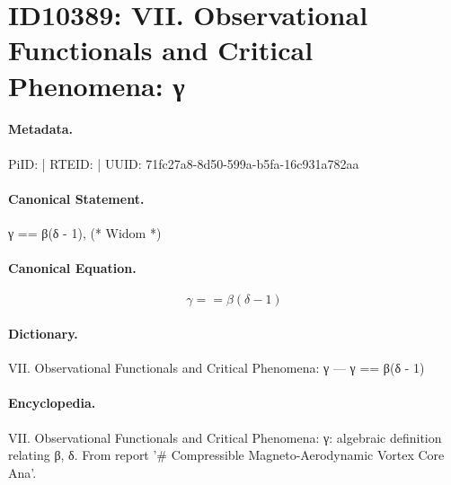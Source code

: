 \section*{ID10389: VII. Observational Functionals and Critical Phenomena: γ}
\paragraph{Metadata.}
PiID:  | RTEID:  | UUID: 71fc27a8-8d50-599a-b5fa-16c931a782aa

\paragraph{Canonical Statement.}
γ == β(δ - 1), (* Widom *)

\paragraph{Canonical Equation.}
\[
γ == β(δ - 1)
\]

\paragraph{Dictionary.}
VII. Observational Functionals and Critical Phenomena: γ — γ == β(δ - 1)

\paragraph{Encyclopedia.}
VII. Observational Functionals and Critical Phenomena: γ: algebraic definition relating β, δ. From report '\# Compressible Magneto-Aerodynamic Vortex Core Ana'.
